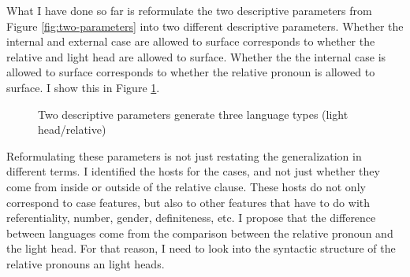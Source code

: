 What I have done so far is reformulate the two descriptive parameters from Figure \ref{fig:two-parameters} into two different descriptive parameters. Whether the internal and external case are allowed to surface corresponds to whether the relative and light head are allowed to surface. Whether the the internal case is allowed to surface corresponds to whether the relative pronoun is allowed to surface. I show this in Figure \ref{fig:two-parameters-different}.

\begin{figure}[H]
  \centering
    \footnotesize{
    }
    \caption{Two descriptive parameters generate three language types (light head/relative)}
    \label{fig:two-parameters-different}
\end{figure}

Reformulating these parameters is not just restating the generalization in different terms. I identified the hosts for the cases, and not just whether they come from inside or outside of the relative clause. These hosts do not only correspond to case features, but also to other features that have to do with referentiality, number, gender, definiteness, etc. I propose that the difference between languages come from the comparison between the relative pronoun and the light head. For that reason, I need to look into the syntactic structure of the relative pronouns an light heads.

